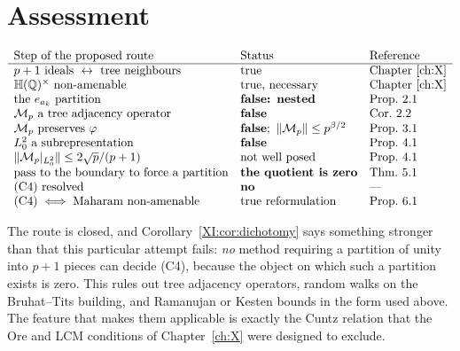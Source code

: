 \section{Assessment}

\[
\begin{array}{lll}
\text{Step of the proposed route} & \text{Status} & \text{Reference}\\\hline
p+1\ \text{ideals}\ \leftrightarrow\ \text{tree neighbours} & \text{true} & \text{Chapter~\ref{ch:X}}\\
\mathbb{H}(\mathbb{Q})^\times\ \text{non-amenable} & \text{true, necessary} & \text{Chapter~\ref{ch:X}}\\
\text{the}\ e_{a_k}\ \text{partition} & \textbf{false: nested} & \text{Prop.~2.1}\\
\mathcal{M}_p\ \text{a tree adjacency operator} & \textbf{false} & \text{Cor.~2.2}\\
\mathcal{M}_p\ \text{preserves}\ \varphi & \textbf{false};\ \|\mathcal{M}_p\|\le p^{\beta/2} & \text{Prop.~3.1}\\
L^2_0\ \text{a subrepresentation} & \textbf{false} & \text{Prop.~4.1}\\
\|\mathcal{M}_p|_{L^2_0}\|\le2\sqrt p/(p+1) & \text{not well posed} & \text{Prop.~4.1}\\
\text{pass to the boundary to force a partition} & \textbf{the quotient is zero} & \text{Thm.~5.1}\\
\text{(C4) resolved} & \textbf{no} & \text{---}\\
\text{(C4)}\iff\text{Maharam non-amenable} & \text{true reformulation} & \text{Prop.~6.1}
\end{array}
\]

The route is closed, and Corollary~\ref{XI:cor:dichotomy} says something stronger than that this
particular attempt fails: \emph{no} method requiring a partition of unity into $p+1$ pieces
can decide (C4), because the object on which such a partition exists is zero. This rules
out tree adjacency operators, random walks on the Bruhat--Tits building, and Ramanujan or
Kesten bounds in the form used above. The feature that makes them applicable is exactly the
Cuntz relation that the Ore and LCM conditions of Chapter~\ref{ch:X} were designed to exclude.

